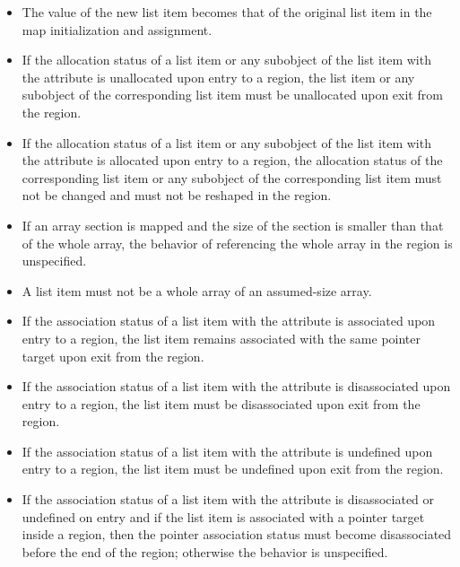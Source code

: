 \begin{fortranspecific}
\begin{itemize}
\item The value of the new list item becomes that of the original list item in the map
initialization and assignment.

\item If the allocation status of a list item or any subobject of the
  list item with the  attribute is unallocated upon
  entry to a  region, the list item or any subobject of
  the corresponding list item must be unallocated upon exit from the
  region.

\item If the allocation status of a list item or any subobject of the
  list item with the  attribute is allocated upon
  entry to a  region, the allocation status of the
  corresponding list item or any subobject of the corresponding list
  item must not be changed and must not be reshaped in the region.

\item If an array section is mapped and the size of the section is
  smaller than that of the whole array, the behavior of referencing
  the whole array in the  region is unspecified.

\item A list item must not be a whole array of an assumed-size array.

\item If the association status of a list item with the 
  attribute is associated upon entry to a  region, the
  list item remains associated with the same pointer target upon exit
  from the region.

\item If the association status of a list item with the 
  attribute is disassociated upon entry to a  region, the
  list item must be disassociated upon exit from the region.

\item If the association status of a list item with the 
  attribute is undefined upon entry to a  region, the
  list item must be undefined upon exit from the region.

\item If the association status of a list item with the 
  attribute is disassociated or undefined on entry and if the list
  item is associated with a pointer target inside a 
  region, then the pointer association status must become
  disassociated before the end of the region; otherwise the behavior
  is unspecified.

\end{itemize}
\end{fortranspecific}

